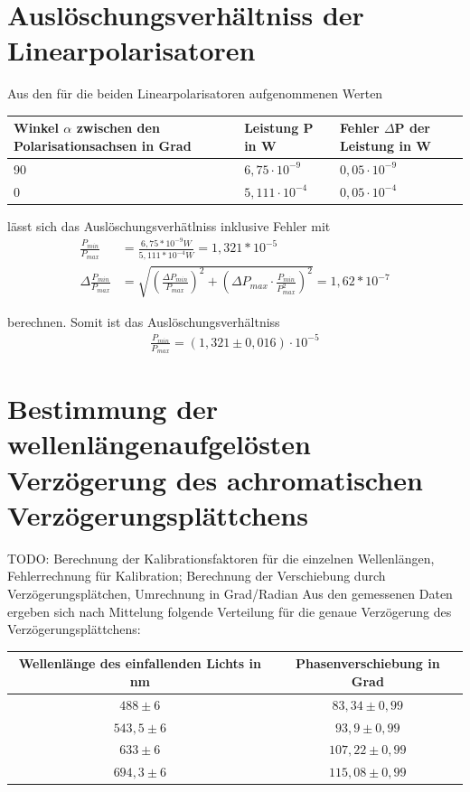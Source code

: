 \documentclass[bigchapter,colorback,accentcolor=tud4b,linedtoc,11pt]{tudreport}
\begin{document}
\section{Auslöschungsverhältniss der Linearpolarisatoren}
Aus den für die beiden Linearpolarisatoren aufgenommenen Werten
\begin{center}
  \begin{tabular}{|p{5cm}|p{4cm}|p{4.5cm}|}
    \hline
        Winkel $\alpha$ zwischen den Polarisationsachsen in Grad & Leistung P in W & Fehler $\Delta$P der Leistung in W \\ \hline
        90 & $6,75 \cdot 10^{-9}$ & $0,05 \cdot 10^{-9}$ \\ \hline
        0 & $5,111 \cdot 10^{-4}$ & $0,05 \cdot 10^{-4}$ \\ \hline
	\end{tabular}
\end{center}

lässt sich das Auslöschungsverhätlniss inklusive Fehler mit
\begin{align*}
  \frac{P_{min}}{P_{max}} &= \frac{6,75*10^{-9} W}{5,111*10^{-4} W} = 1,321*10^{-5} \\
  \Delta\frac{P_{min}}{P_{max}} &= \sqrt{\left(\frac{\Delta P_{min}}{P_{max}}\right)^2 + \left(\Delta P_{max} \cdot \frac{P_{min}}{P_{max}^2}\right)^2} = 1,62 * 10^{-7}
\end{align*}

berechnen. Somit ist das Auslöschungsverhältniss
\begin{align*}
\frac{P_{min}}{P_{max}} =\left(1,321\pm0,016\right) \cdot 10^{-5}
\end{align*}
\section{Bestimmung der wellenlängenaufgelösten Verzögerung des achromatischen Verzögerungsplättchens}
TODO: Berechnung der Kalibrationsfaktoren für die einzelnen Wellenlängen, Fehlerrechnung für Kalibration; Berechnung der Verschiebung durch Verzögerungsplätchen, Umrechnung in Grad/Radian
Aus den gemessenen Daten ergeben sich nach Mittelung folgende Verteilung für die genaue Verzögerung des Verzögerungsplättchens:
\begin{center}
  \begin{tabular}{|c|c|}
    \hline
        Wellenlänge des einfallenden Lichts in nm & Phasenverschiebung in Grad \\ \hline
        $488 \pm 6$ & $83,34 \pm 0,99$ \\ \hline
        $543,5 \pm 6$ & $93,9 \pm 0,99$ \\ \hline
        $633 \pm 6$ & $107,22 \pm 0,99$ \\ \hline
        $694,3 \pm 6$ & $115,08 \pm 0,99$ \\ \hline
	\end{tabular}
\end{center}
\end{document}
